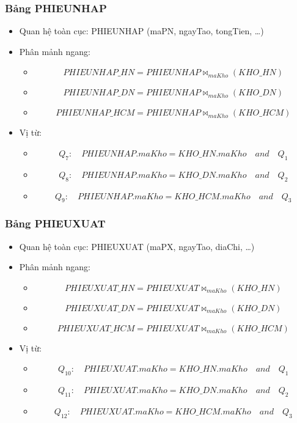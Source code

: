 \documentclass[a4paper,12pt]{report}
\begin{document}
\subsubsection{Bảng PHIEUNHAP}
\begin{itemize}
    \item Quan hệ toàn cục: PHIEUNHAP (maPN, ngayTao, tongTien,  \ldots)
    \item Phân mảnh ngang:
        \begin{itemize}[label=]
            \item \[PHIEUNHAP\_HN = PHIEUNHAP \bowtie_{maKho}(KHO\_HN)\]
            \item \[PHIEUNHAP\_DN = PHIEUNHAP \bowtie_{maKho}(KHO\_DN)\]
            \item \[PHIEUNHAP\_HCM = PHIEUNHAP \bowtie_{maKho}(KHO\_HCM)\]
        \end{itemize}
    \item Vị từ:
    \begin{itemize}[label=]
        \item \[Q_7\colon\quad PHIEUNHAP.maKho = KHO\_HN.maKho \quad and \quad Q_1\]
        \item \[Q_8\colon\quad PHIEUNHAP.maKho = KHO\_DN.maKho \quad and \quad Q_2 \]
        \item \[Q_9\colon\quad PHIEUNHAP.maKho = KHO\_HCM.maKho \quad and \quad Q_3\]
    \end{itemize}
\end{itemize}
\subsubsection{Bảng PHIEUXUAT}
\begin{itemize}
    \item Quan hệ toàn cục: PHIEUXUAT (maPX, ngayTao, diaChi,  \ldots)
    \item Phân mảnh ngang:
        \begin{itemize}[label=]
            \item \[PHIEUXUAT\_HN = PHIEUXUAT \bowtie_{maKho}(KHO\_HN)\]
            \item \[PHIEUXUAT\_DN = PHIEUXUAT \bowtie_{maKho}(KHO\_DN)\]
            \item \[PHIEUXUAT\_HCM = PHIEUXUAT \bowtie_{maKho}(KHO\_HCM)\]
        \end{itemize}
    \item Vị từ:
    \begin{itemize}[label=]
        \item \[Q_10\colon\quad PHIEUXUAT.maKho = KHO\_HN.maKho \quad and \quad Q_1\]
        \item \[Q_11\colon\quad PHIEUXUAT.maKho = KHO\_DN.maKho \quad and \quad Q_2 \]
        \item \[Q_12\colon\quad PHIEUXUAT.maKho = KHO\_HCM.maKho \quad and \quad Q_3\]
    \end{itemize}
\end{itemize}
\end{document}
